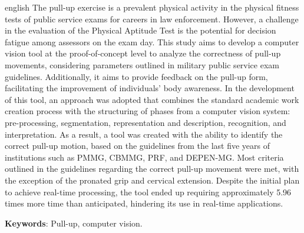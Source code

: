 \documentclass[
	12pt,			%
	openany,		%
	oneside,		%
	a4paper,		%
	english,		%
	brazil			%
	]{abntex2}
\begin{document}
\begin{resumo}[Abstract]
 \begin{otherlanguage*}{english}
	The pull-up exercise is a prevalent physical activity in the physical fitness tests of public service exams for careers in law enforcement. However, a challenge in the evaluation of the Physical Aptitude Test is the potential for decision fatigue among assessors on the exam day.	This study aims to develop a computer vision tool at the proof-of-concept level to analyze the correctness of pull-up movements, considering parameters outlined in military public service exam guidelines. Additionally, it aims to provide feedback on the pull-up form, facilitating the improvement of individuals' body awareness. In the development of this tool, an approach was adopted that combines the standard academic work creation process with the structuring of phases from a computer vision system: pre-processing, segmentation, representation and description, recognition, and interpretation. As a result, a tool was created with the ability to identify the correct pull-up motion, based on the guidelines from the last five years of institutions such as \ac{PMMG}, \ac{CBMMG}, \ac{PRF}, and \ac{DEPEN-MG}. Most criteria outlined in the guidelines regarding the correct pull-up movement were met, with the exception of the pronated grip and cervical extension. Despite the initial plan to achieve real-time processing, the tool ended up requiring approximately 5.96 times more time than anticipated, hindering its use in real-time applications.

 \textbf{Keywords}: Pull-up, computer vision.
 \end{otherlanguage*}
\end{resumo}


\listoffigures*
\cleardoublepage






\tableofcontents*
\cleardoublepage

\textual
\end{document}
